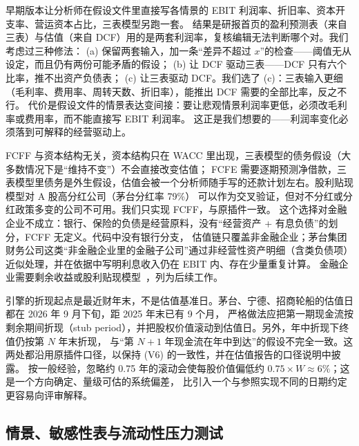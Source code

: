 \begin{tradeoff}
早期版本让分析师在假设文件里直接写各情景的 EBIT 利润率、折旧率、资本开支率、营运资本占比，三表模型另跑一套。
结果是研报首页的盈利预测表（来自三表）与估值（来自 DCF）用的是两套利润率，复核编辑无法判断哪个对。我们考虑过三种修法：
(a) 保留两套输入，加一条“差异不超过 $x$”的检查——阈值无从设定，而且仍有两份可能矛盾的假设；
(b) 让 DCF 驱动三表——DCF 只有六个比率，推不出资产负债表；
(c) 让三表驱动 DCF。我们选了 (c)：三表输入更细（毛利率、费用率、周转天数、折旧率），能推出 DCF 需要的全部比率，反之不行。
代价是假设文件的情景表达变间接：要让悲观情景利润率更低，必须改毛利率或费用率，而不能直接写 EBIT 利润率。
这正是我们想要的——利润率变化必须落到可解释的经营驱动上。
\end{tradeoff}

\begin{tradeoff}
FCFF 与资本结构无关，资本结构只在 WACC 里出现，三表模型的债务假设（大多数情况下是“维持不变”）不会直接改变估值；
FCFE 需要逐期预测净借款，三表模型里债务是外生假设，估值会被一个分析师随手写的还款计划左右。股利贴现模型对 A 股高分红公司（茅台分红率 79\%）
可以作为交叉验证，但对不分红或分红政策多变的公司不可用。我们只实现 FCFF，与原插件一致。
这个选择对金融企业不成立：银行、保险的负债是经营原料，没有“经营资产 + 有息负债”的划分，FCFF 无定义。代码中没有银行分支，
估值链只覆盖非金融企业；茅台集团财务公司这类“非金融企业里的金融子公司”通过非经营性资产明细（含类负债项）近似处理，并在依据中写明利息收入仍在 EBIT 内、存在少量重复计算。
金融企业需要剩余收益或股利贴现模型~\cite{damodaran2012investment}，列为后续工作。
\end{tradeoff}

\begin{tradeoff}
引擎的折现起点是最近财年末，不是估值基准日。茅台、宁德、招商轮船的估值日都在 2026 年 9 月下旬，距 2025 年末已有 9 个月，
严格做法应把第一期现金流按剩余期间折现（stub period），并把股权价值滚动到估值日。另外，年中折现下终值仍按第 $N$ 年末折现，
与“第 $N+1$ 年现金流在年中到达”的假设不完全一致。这两处都沿用原插件口径，以保持 (V6) 的一致性，并在估值报告的口径说明中披露。
按一般经验，忽略约 0.75 年的滚动会使每股价值偏低约 $0.75\times W\approx6\%$；这是一个方向确定、量级可估的系统偏差，
比引入一个与参照实现不同的日期约定更容易向评审解释。
\end{tradeoff}

\subsection{情景、敏感性表与流动性压力测试}
\label{sec:val-scenarios}

